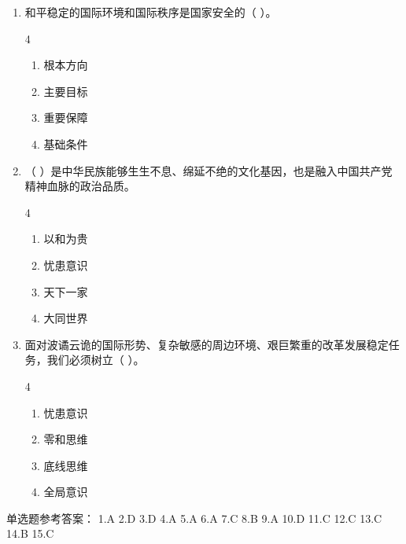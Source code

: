 \documentclass[a4paper,11pt]{ctexart}
\begin{document}
\begin{enumerate}
    \item 和平稳定的国际环境和国际秩序是国家安全的（ ）。
    \begin{multicols}{4}
    \begin{enumerate}
        \item 根本方向
        \item 主要目标
        \item 重要保障
        \item 基础条件
    \end{enumerate}
    \end{multicols}

    \item （ ）是中华民族能够生生不息、绵延不绝的文化基因，也是融入中国共产党精神血脉的政治品质。
    \begin{multicols}{4}
    \begin{enumerate}
        \item 以和为贵
        \item 忧患意识
        \item 天下一家
        \item 大同世界
    \end{enumerate}
    \end{multicols}

    \item 面对波谲云诡的国际形势、复杂敏感的周边环境、艰巨繁重的改革发展稳定任务，我们必须树立（ ）。
    \begin{multicols}{4}
    \begin{enumerate}
        \item 忧患意识
        \item 零和思维
        \item 底线思维
        \item 全局意识
    \end{enumerate}
    \end{multicols}
\end{enumerate}

\begin{answerbox}
单选题参考答案：
1.A \quad 2.D \quad 3.D \quad 4.A \quad 5.A \quad 6.A \quad 7.C \quad 8.B \quad 9.A \quad 10.D \quad 11.C \quad 12.C \quad 13.C \quad 14.B \quad 15.C
\end{answerbox}
\end{document}
